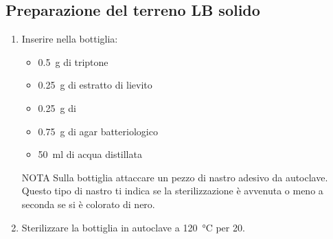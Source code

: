 \subsection{Preparazione del terreno LB solido}
\begin{enumerate}
	\item Inserire nella bottiglia:
	\begin{itemize}
		\item \qty{0.5}{\g} di triptone
		\item \qty{0.25}{\g} di estratto di lievito
		\item \qty{0.25}{\g} di 
		\item \qty{0.75}{\g} di agar batteriologico
		\item \qty{50}{\ml} di acqua distillata
	\end{itemize}
	\begin{myBox}{NOTA}
		Sulla bottiglia attaccare un pezzo di nastro adesivo da autoclave. Questo tipo di nastro ti indica se la sterilizzazione è avvenuta o meno a seconda se si è colorato di nero.
	\end{myBox}
	\item Sterilizzare la bottiglia in autoclave a \qty{120}{\celsius}  per \qty{20}{\min}. 
	

\end{enumerate}
